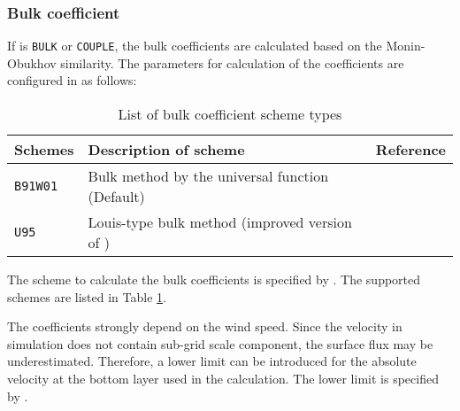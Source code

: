 \subsubsection{Bulk coefficient}
If  is \verb|BULK| or \verb|COUPLE|, the bulk coefficients are calculated based on the Monin-Obukhov similarity.
The parameters for calculation of the coefficients are configured in  as follows:

\begin{table}[h]
\begin{center}
  \caption{List of bulk coefficient scheme types}
  \label{tab:nml_bulk}
  \begin{tabularx}{150mm}{llX} \hline
    \rowcolor[gray]{0.9}  Schemes & Description of scheme & Reference\\ \hline
      \verb|B91W01| & Bulk method by the universal function (Default) & \citet{beljaars_1991,wilson_2001} \\
      \verb|U95|    & Louis-type bulk method  (improved version of \citet{louis_1979}) & \citet{uno_1995} \\
    \hline
  \end{tabularx}
\end{center}
\end{table}

The scheme to calculate the bulk coefficients is specified by .
The supported schemes are listed in Table \ref{tab:nml_bulk}.

The coefficients strongly depend on the wind speed.
Since the velocity in simulation does not contain sub-grid scale component, the surface flux may be underestimated.
Therefore, a lower limit can be introduced for the absolute velocity at the bottom layer used in the calculation.
The lower limit is specified by .

